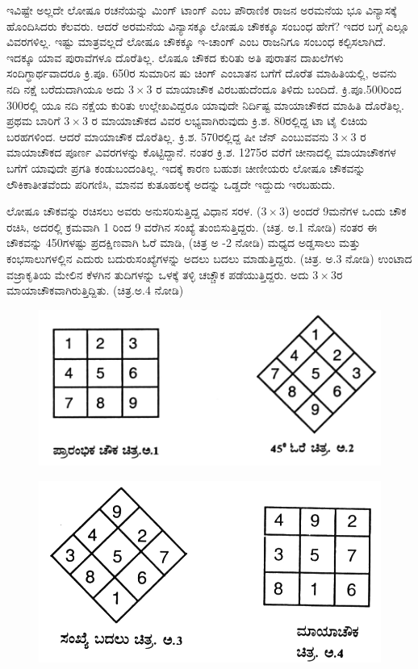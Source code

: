 \smallskip
ಇವಿಷ್ಟೇ ಅಲ್ಲದೇ ಲೋಷೂ ರಚನೆಯನ್ನು ಮಿಂಗ್ ಟಾಂಗ್ ಎಂಬ ಪೌರಾಣಿಕ ರಾಜನ ಅರಮನೆಯ ಭೂ ವಿನ್ಯಾಸಕ್ಕೆ ಹೊಂದಿಸಿದರು ಕೆಲವರು. ಆದರೆ ಅರಮನೆಯ ವಿನ್ಯಾಸಕ್ಕೂ ಲೋಷೂ ಚೌಕಕ್ಕೂ ಸಂಬಂಧ ಹೇಗೆ? ಇದರ ಬಗ್ಗೆ ಎಲ್ಲೂ ವಿವರಗಳಿಲ್ಲ. ಇಷ್ಟು ಮಾತ್ರವಲ್ಲದೆ ಲೋಷೂ ಚೌಕಕ್ಕೂ ಇ-ಚಾಂಗ್ ಎಂಬ ರಾಜನಿಗೂ ಸಂಬಂಧ ಕಲ್ಪಿಸಲಾಗಿದೆ. \hbox{ಇದಕ್ಕೂ} ಯಾವ ಪುರಾವೆಗಳೂ ದೊರೆತಿಲ್ಲ. ಲೊಷೂ ಚೌಕದ ಕುರಿತು ಅತಿ ಪುರಾತನ ದಾಖಲೆಗಳು ಸಂದಿಗ್ಧಾರ್ಥವಾದರೂ ಕ್ರಿ.ಪೂ. 650ರ ಸುಮಾರಿನ ಷು ಚಿಂಗ್ ಎಂಬಾತನ ಬಗೆಗೆ ದೊರೆತ ಮಾಹಿತಿಯಲ್ಲಿ, ಅವನು ನದಿ ನಕ್ಷೆ ಬರೆದುದಾಗಿಯೂ ಅದು $3 \times 3$ ರ ಮಾಯಾಚೌಕ \hbox{ವಿರಬಹುದೆಂದೂ} ತಿಳಿದು ಬಂದಿದೆ. ಕ್ರಿ.ಪೂ.500ರಿಂದ 300ರಲ್ಲಿ ಯೂ ನದಿ ನಕ್ಷೆಯ \hbox{ಕುರಿತು} ಉಲ್ಲೇಖವಿದ್ದರೂ ಯಾವುದೇ ನಿರ್ದಿಷ್ಟ ಮಾಯಾಚೌಕದ ಮಾಹಿತಿ ದೊರೆತಿಲ್ಲ. ಪ್ರಥಮ ಬಾರಿಗೆ $3 \times 3$ ರ ಮಾಯಾ\-ಚೌಕದ ವಿವರ ಲಭ್ಯವಾಗಿರುವುದು ಕ್ರಿ.ಶ. 80ರಲ್ಲಿದ್ದ ಟಾ ಟೈ ಲಿಚಿಯ ಬರಹ\-ಗಳಿಂದ. ಆದರೆ ಮಾಯಾಚೌಕ ದೊರೆತಿಲ್ಲ. ಕ್ರಿ.ಶ. 570ರಲ್ಲಿದ್ದ ಷೀ ಜೆನ್ ಎಂಬುವವನು $3 \times 3$ ರ ಮಾಯಾಚೌಕದ ಪೂರ್ಣ ವಿವರಗಳನ್ನು ಕೊಟ್ಟಿದ್ದಾನೆ. ನಂತರ ಕ್ರಿ.ಶ. 1275ರ ವರೆಗೆ ಚೀನಾದಲ್ಲಿ ಮಾಯಾಚೌಕಗಳ ಬಗೆಗೆ ಯಾವುದೇ ಪ್ರಗತಿ ಕಂಡುಬಂದಂತಿಲ್ಲ. \linebreak ಇದಕ್ಕೆ ಕಾರಣ ಬಹುಶಃ ಚೀಣೀಯರು ಲೋಷೂ ಚೌಕವನ್ನು ಲೌಕಿಕಾತೀತವೆಂದು ಪರಿಗಣಿಸಿ, \break ಮಾನವ ಕುತೂಹಲಕ್ಕೆ ಅದನ್ನು ಒಡ್ಡದೇ ಇದ್ದುದು ಇರಬಹುದು.

\smallskip
ಲೋಷೂ ಚೌಕವನ್ನು ರಚಿಸಲು ಅವರು ಅನುಸರಿಸುತ್ತಿದ್ದ ವಿಧಾನ ಸರಳ. ($3 \times 3$) ಅಂದರೆ 9ಮನೆಗಳ ಒಂದು ಚೌಕ ರಚಿಸಿ, ಅದರಲ್ಲಿ ಕ್ರಮವಾಗಿ 1 ರಿಂದ 9 ವರೆಗಿನ ಸಂಖ್ಯೆ ತುಂಬಿಸುತ್ತಿದ್ದರು. (ಚಿತ್ರ. ಅ.1 ನೋಡಿ) ನಂತರ ಈ ಚೌಕವನ್ನು 450ಗಳಷ್ಟು ಪ್ರದಕ್ಷಿಣವಾಗಿ ಓರೆ ಮಾಡಿ, (ಚಿತ್ರ ಅ -2 ನೋಡಿ) ಮಧ್ಯದ ಅಡ್ಡಸಾಲು ಮತ್ತು ಕಂಭಸಾಲುಗಳಲ್ಲಿನ ಎದುರು ಬದುರುಸಂಖ್ಯೆಗಳನ್ನು ಅದಲು ಬದಲು ಮಾಡುತ್ತಿದ್ದರು. (ಚಿತ್ರ. ಅ.3 ನೋಡಿ) ಉಂಟಾದ ವಜ್ರಾಕೃತಿಯ ಮೇಲಿನ ಕೆಳಗಿನ ತುದಿಗಳನ್ನು ಒಳಕ್ಕೆ ತಳ್ಳಿ ಚಚ್ಚೌಕ ಪಡೆಯುತ್ತಿದ್ದರು. ಅದು $3 \times 3$ರ ಮಾಯಾಚೌಕವಾಗಿರುತ್ತಿದ್ದಿತು. (ಚಿತ್ರ.ಅ.4 ನೋಡಿ)
\begin{figure}[H]
\includegraphics{src/figures/chap9/fig9-2.jpg}
\end{figure}
\begin{figure}[H]
\includegraphics{src/figures/chap9/fig9-3.jpg}
\end{figure}

